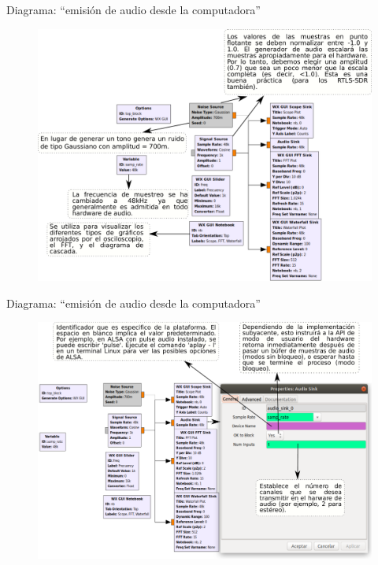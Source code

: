 \begin{frame}{Diagrama:  “emisión de audio desde la computadora”}

\begin{figure}

\begin{center}
\vspace{-2mm}
    \includegraphics[width=.85\textwidth]{parte1/lab3/pdf/lab3_2.pdf}
\end{center}
\end{figure}

\end{frame}

\begin{frame}{Diagrama:  “emisión de audio desde la computadora”}

\begin{figure}

\begin{center}
\vspace{-1mm}
\includegraphics[width=.92\textwidth]{parte1/lab3/pdf/lab3_3.pdf}
\end{center}
\end{figure}

\end{frame}

